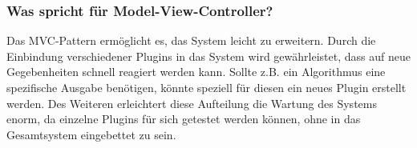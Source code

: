 \subsubsection{Was spricht für Model-View-Controller?}
Das MVC-Pattern ermöglicht es, das System leicht zu erweitern. 
Durch die Einbindung verschiedener Plugins in das System wird gewährleistet, dass auf neue Gegebenheiten schnell reagiert werden kann.
Sollte z.B. ein Algorithmus eine spezifische Ausgabe benötigen, könnte speziell für diesen ein neues Plugin erstellt werden. 
Des Weiteren erleichtert diese Aufteilung die Wartung des Systems enorm, da einzelne Plugins für sich getestet werden können, ohne in das Gesamtsystem eingebettet zu sein. 

